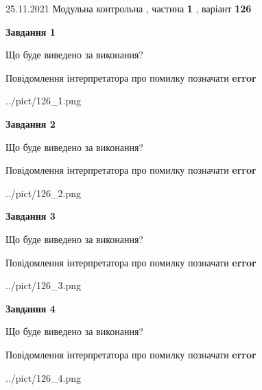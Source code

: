 \documentclass[10pt, ukrainian]{article}
\begin{document}
{25.11.2021 Модульна контрольна , частина \textbf { 1 }, варіант  \No \textbf { 126 }\par}
{
\begin {large}

{\begin {center}\textbf{Завдання 1}\end {center}}\par
Що буде виведено за виконання? \par
Повідомлення інтерпретатора про помилку позначати \textbf{error}

\begin{center}
	{../pict/126_1.png}
\end{center}
\newpage

{\begin {center}\textbf{Завдання 2}\end {center}}\par
Що буде виведено за виконання? \par
Повідомлення інтерпретатора про помилку позначати \textbf{error}

\begin{center}
	{../pict/126_2.png}
\end{center}
\newpage

{\begin {center}\textbf{Завдання 3}\end {center}}\par
Що буде виведено за виконання? \par
Повідомлення інтерпретатора про помилку позначати \textbf{error}

\begin{center}
	{../pict/126_3.png}
\end{center}
\newpage

{\begin {center}\textbf{Завдання 4}\end {center}}\par
Що буде виведено за виконання? \par
Повідомлення інтерпретатора про помилку позначати \textbf{error}

\begin{center}
	{../pict/126_4.png}
\end{center}
\newpage


\end{large}}
\end{document}
